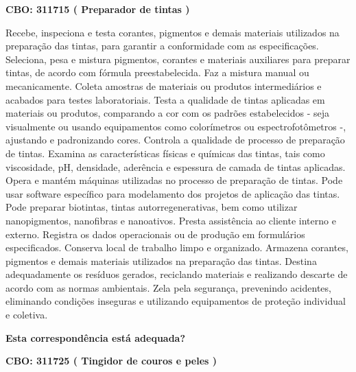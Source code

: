 \documentclass[
]{article}
\begin{document}
\textbf{CBO: 311715  ( Preparador de tintas )}

Recebe, inspeciona e testa corantes, pigmentos e demais materiais
utilizados na preparação das tintas, para garantir a conformidade com as
especificações. Seleciona, pesa e mistura pigmentos, corantes e
materiais auxiliares para preparar tintas, de acordo com fórmula
preestabelecida. Faz a mistura manual ou mecanicamente. Coleta amostras
de materiais ou produtos intermediários e acabados para testes
laboratoriais. Testa a qualidade de tintas aplicadas em materiais ou
produtos, comparando a cor com os padrões estabelecidos - seja
visualmente ou usando equipamentos como colorímetros ou
espectrofotômetros -, ajustando e padronizando cores. Controla a
qualidade de processo de preparação de tintas. Examina as
características físicas e químicas das tintas, tais como viscosidade,
pH, densidade, aderência e espessura de camada de tintas aplicadas.
Opera e mantém máquinas utilizadas no processo de preparação de tintas.
Pode usar software específico para modelamento dos projetos de aplicação
das tintas. Pode preparar biotintas, tintas autorregenerativas, bem como
utilizar nanopigmentos, nanofibras e nanoativos. Presta assistência ao
cliente interno e externo. Registra os dados operacionais ou de produção
em formulários especificados. Conserva local de trabalho limpo e
organizado. Armazena corantes, pigmentos e demais materiais utilizados
na preparação das tintas. Destina adequadamente os resíduos gerados,
reciclando materiais e realizando descarte de acordo com as normas
ambientais. Zela pela segurança, prevenindo acidentes, eliminando
condições inseguras e utilizando equipamentos de proteção individual e
coletiva.

\begin{Form}
\textbf{Esta correspondência está adequada?} \\ 
\end{Form}

\textbf{CBO: 311725  ( Tingidor de couros e peles )}
\end{document}
